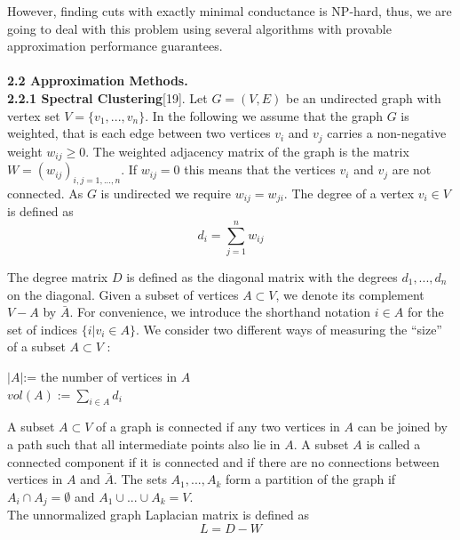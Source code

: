 \documentclass[12pt]{article}
\begin{document}
However, finding cuts with exactly minimal conductance is NP-hard, thus, we are going to deal with this problem using several algorithms with provable approximation performance guarantees.\\\\
\textbf{2.2 Approximation Methods.}\\
\textbf{2.2.1 Spectral Clustering}[19]. Let $G = (V, E)$ be an undirected graph with vertex set $V = \{v_1 ,..., v_n \}$. In the following we assume that the graph $G$ is weighted, that is each edge between two vertices $v_i$ and $v_j$ carries a non-negative weight $w_{ij}\geq 0$. The weighted adjacency matrix of the graph is the matrix $W =(w_{ij})_{i,j=1,...,n}$. If $w_{ij}=0$ this means that the vertices $v_i$ and $v_j$ are not connected. As $G$ is undirected we require $w_{ij}= w_{ji}$. The degree of a vertex $v_i \in V$ is defined as
$$d_i=\sum^n_{j=1}w_{ij}$$

The degree matrix $D$ is defined as the diagonal matrix with the degrees $d_1 ,..., d_n$ on the diagonal. Given a subset of vertices $A \subset V $, we denote its complement $V-A$ by $\bar{A}$. For convenience, we introduce the shorthand notation $i \in A$ for the set of indices $\{i| v_i \in A\}$. We consider two different ways of measuring the “size” of a subset $A \subset V$ :
\begin{center}
$|A|$:= the number of vertices in $A$\\
$vol(A):=\sum_{i \in A}d_i$
\end{center}

A subset $A \subset V$ of a graph is connected if any two vertices in $A$ can be joined by a path such that all intermediate points also lie in $A$. A subset $A$ is called a connected component if it is connected and if there are no connections between vertices in $A$ and $\bar{A}$. The sets $A_1 ,..., A_k$ form a partition of the graph if $A_i \cap A_j =\emptyset$ and $A_1 \cup...\cup A_k = V$. \\

The unnormalized graph Laplacian matrix is defined as
$$L=D-W$$
\end{document}
